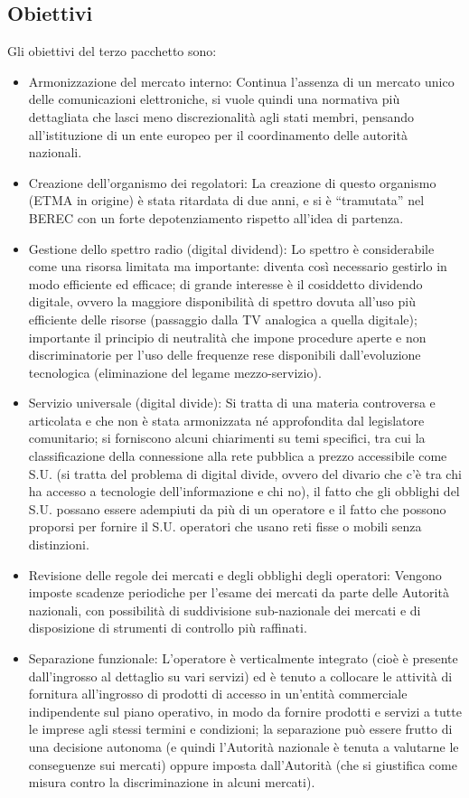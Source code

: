 \subsection{Obiettivi}

Gli obiettivi del terzo pacchetto sono:
\begin{itemize}
    \item Armonizzazione del mercato interno: Continua l’assenza di un mercato unico delle comunicazioni     elettroniche, si vuole quindi una normativa più dettagliata che lasci meno discrezionalità agli stati    membri, pensando all’istituzione di un ente europeo per il coordinamento delle autorità nazionali.
    \item Creazione dell’organismo dei regolatori: La creazione di questo organismo (ETMA in origine) è    stata ritardata di due anni, e si è “tramutata” nel BEREC con un forte depotenziamento rispetto all’idea di partenza.
    \item Gestione dello spettro radio (digital dividend): Lo spettro è considerabile come una risorsa limitata ma importante: diventa così necessario gestirlo in modo efficiente ed efficace; di grande interesse è il cosiddetto dividendo digitale, ovvero la maggiore disponibilità di spettro dovuta all’uso più efficiente delle risorse (passaggio dalla TV analogica a quella digitale); importante il principio di neutralità che impone procedure aperte e non discriminatorie per l’uso delle frequenze rese disponibili dall’evoluzione tecnologica (eliminazione del legame mezzo-servizio).
    \item Servizio universale (digital divide): Si tratta di una materia controversa e articolata e che non è stata armonizzata né approfondita dal legislatore comunitario; si forniscono alcuni chiarimenti su temi specifici, tra cui la classificazione della connessione alla rete pubblica a prezzo accessibile come S.U. (si tratta del problema di digital divide, ovvero del divario che c’è tra chi ha accesso a tecnologie dell’informazione e chi no), il fatto che gli obblighi del S.U. possano essere adempiuti da più di un operatore e il fatto che possono proporsi per fornire il S.U. operatori che usano reti fisse o mobili senza distinzioni.
    \item Revisione delle regole dei mercati e degli obblighi degli operatori: Vengono imposte scadenze periodiche per l’esame dei mercati da parte delle Autorità nazionali, con possibilità di suddivisione sub-nazionale dei mercati e di disposizione di strumenti di controllo più raffinati.
    \item Separazione funzionale: L’operatore è verticalmente integrato (cioè è presente dall’ingrosso al dettaglio su vari servizi) ed è tenuto a collocare le attività di fornitura all’ingrosso di prodotti di accesso in un’entità commerciale indipendente sul piano operativo, in modo da fornire prodotti e servizi a tutte le imprese agli stessi termini e condizioni; la separazione può essere frutto di una decisione autonoma (e quindi l’Autorità nazionale è tenuta a valutarne le conseguenze sui mercati) oppure imposta dall’Autorità (che si giustifica come misura contro la discriminazione in alcuni mercati).

\end{itemize}
